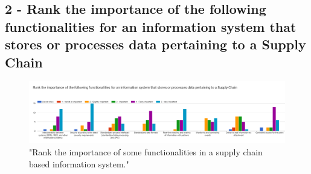 \subsection*{2 - Rank the importance of the following functionalities for an information system that stores or processes data pertaining to a Supply Chain}

\begin{figure}[h]
\centering
\includegraphics[scale=0.28]{media/importance_SC_info_systems.png}
\caption["Rank the importance of some functionalities in a supply chain based information system."]{"Rank the importance of some functionalities in a supply chain based information system."}
\label{fig:importance_SC_info_systems}
\end{figure}


